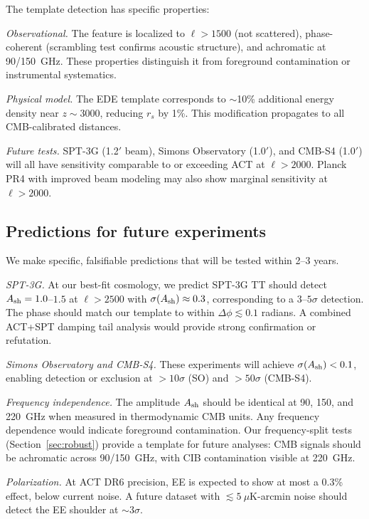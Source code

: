 \documentclass[twocolumn,showpacs,preprintnumbers,amsmath,amssymb,prd]{revtex4-2}
\begin{document}
The template detection has specific properties:

\emph{Observational.} The feature is localized to $\ell > 1500$ (not 
scattered), phase-coherent (scrambling test confirms acoustic structure), and 
achromatic at 90/150~GHz. These properties distinguish it from 
foreground contamination or instrumental systematics.

\emph{Physical model.} The EDE template corresponds to $\sim$10\% 
additional energy density near $z \sim 3000$, reducing $r_s$ by 1\%. 
This modification propagates to all CMB-calibrated distances.

\emph{Future tests.} SPT-3G (1.2$'$ beam), Simons Observatory (1.0$'$), 
and CMB-S4 (1.0$'$) will all have sensitivity comparable to or exceeding 
ACT at $\ell > 2000$. Planck PR4 with improved beam modeling may also 
show marginal sensitivity at $\ell > 2000$.

\subsection{Predictions for future experiments}
\label{sec:predictions}

We make specific, falsifiable predictions that will be tested within 2--3 years.

\emph{SPT-3G.} At our best-fit cosmology, we predict SPT-3G TT should detect 
$A_{\rm sh} = 1.0$--$1.5$ at $\ell > 2500$ with $\sigma(A_{\rm sh}) \approx 0.3$, 
corresponding to a $3$--$5\sigma$ detection. The phase should match our 
template to within $\Delta\phi \lesssim 0.1$ radians. A combined ACT+SPT 
damping tail analysis would provide strong confirmation or refutation.

\emph{Simons Observatory and CMB-S4.} These experiments will achieve 
$\sigma(A_{\rm sh}) < 0.1$, enabling detection or exclusion at $>10\sigma$ 
(SO) and $>50\sigma$ (CMB-S4).

\emph{Frequency independence.} The amplitude $A_{\rm sh}$ should be 
identical at 90, 150, and 220~GHz when measured in thermodynamic CMB units. 
Any frequency dependence would indicate foreground contamination. Our 
frequency-split tests (Section~\ref{sec:robust}) provide a template for 
future analyses: CMB signals should be achromatic across 90/150~GHz, 
with CIB contamination visible at 220~GHz.

\emph{Polarization.} At ACT DR6 precision, EE is expected to show at most 
a 0.3\% effect, below current noise. A future dataset with 
$\lesssim 5~\mu$K-arcmin noise should detect the EE shoulder at $\sim 3\sigma$.
\end{document}
